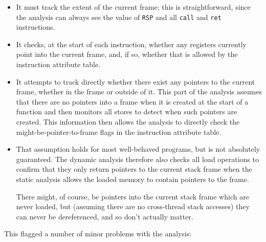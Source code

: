 \begin{itemize}
\item
  It must track the extent of the current frame; this is
  straightforward, since the analysis can always see the value
  of \verb|RSP| and all \verb|call| and \verb|ret| instructions.
\item
  It checks, at the start of each instruction, whether any registers
  currently point into the current frame, and, if so, whether that is
  allowed by the instruction attribute table.
\item
  It attempts to track directly whether there exist any pointers to
  the current frame, whether in the frame or outside of it.  This part
  of the analysis assumes that there are no pointers into a frame when
  it is created at the start of a function and then monitors all
  stores to detect when such pointers are created.  This information
  then allows the analysis to directly check the
  might-be-pointer-to-frame flags in the instruction attribute table.
\item
  That assumption holds for most well-behaved programs, but is not
  absolutely guaranteed.  The dynamic analysis therefore also checks
  all load operations to confirm that they only return pointers to the
  current stack frame when the static analysis allows the loaded
  memory to contain pointers to the frame.

  There might, of course, be pointers into the current stack frame
  which are never loaded, but (assuming there are no cross-thread
  stack accesses) they can never be dereferenced, and so don't
  actually matter.
\end{itemize}

This flagged a number of minor problems with the analysis:

